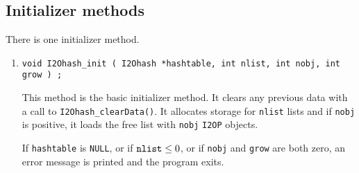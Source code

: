 \subsection{Initializer methods}
\label{subsection:I2Ohash:proto:initializers}
\par
There is one initializer method.
\par
\begin{enumerate}
\item
\begin{verbatim}
void I2Ohash_init ( I2Ohash *hashtable, int nlist, int nobj, int grow ) ;
\end{verbatim}
This method is the basic initializer method.
It clears any previous data with a call to 
{\tt I2Ohash\_clearData()}. 
It allocates storage for {\tt nlist} lists
and if {\tt nobj} is positive, it loads the free list
with {\tt nobj} {\tt I2OP} objects.
\par {}
If {\tt hashtable} is {\tt NULL},
or if ${\tt nlist} \le 0$,
or if {\tt nobj} and {\tt grow} are both zero,
an error message is printed and the program exits.
\end{enumerate}
\par
